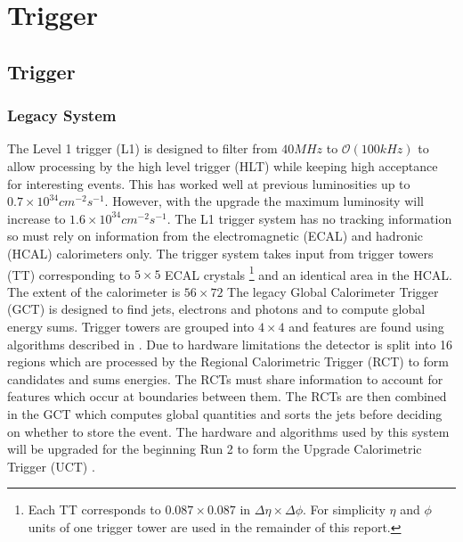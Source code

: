 
\chapter{Trigger} %

\label{Chapter3} %



\section{Trigger}
\subsection{Legacy System}
The Level 1 trigger (L1) is designed to filter from $40MHz$ to $\mathcal{O}(100kHz)$ to allow processing by the high level trigger (HLT) while keeping high acceptance for interesting events. This has worked well at previous luminosities up to $0.7\times10^{34} cm^{-2}s^{-1}$. However, with the upgrade the maximum luminosity will increase to $1.6\times10^{34} cm^{-2}s^{-1}$. The L1 trigger system has no tracking information so must rely on information from the electromagnetic (ECAL) and hadronic (HCAL) calorimeters only\cite{gct}. The trigger system takes input from  trigger towers (TT) corresponding to $5\times5$ ECAL crystals \footnote{Each TT corresponds to $0.087\times0.087$ in $\Delta\eta\times\Delta\phi$. For simplicity $\eta$ and $\phi$ units of one trigger tower are used in the remainder of this report.} and an identical area in the HCAL. The extent of the calorimeter is $56\times72$ The legacy Global Calorimeter Trigger (GCT) is designed to find jets, electrons and photons and to compute global energy sums. Trigger towers are grouped into $4\times4$ and features are found using algorithms described in \cite{algos}. Due to hardware limitations the detector is split into 16 regions which are processed by the Regional Calorimetric Trigger (RCT) to form candidates and sums energies. The RCTs must share information to account for features which occur at boundaries between them. The RCTs are then combined in the GCT which computes global quantities and sorts the jets before deciding on whether to store the event. The hardware and algorithms used by this system will be upgraded for the beginning Run 2 to form the Upgrade Calorimetric Trigger (UCT) \cite{UCT}.

